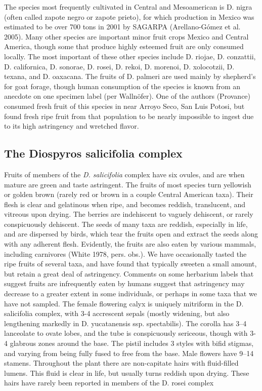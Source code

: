 \documentclass[]{article}
\begin{document}
The species most frequently cultivated in Central and Mesoamerican is D. nigra (often called zapote negro or zapote prieto), for which production in Mexico was estimated to be over 700 tons in 2001 by SAGARPA (Arellano-Gómez et al. 2005). Many other species are important minor fruit crops Mexico and Central America, though some that produce highly esteemed fruit are only consumed locally. The most important of these other species include D. riojae, D. conzattii, D. californica, D. sonorae, D. rosei, D. rekoi, D. morenoi, D. xolocotzii, D. texana, and D. oaxacana. The fruits of D. palmeri are used mainly by shepherd’s for goat forage, though human consumption of the species is known from an anecdote on one specimen label (per Wallnöfer). One of the authors (Provance) consumed fresh fruit of this species in near Arroyo Seco, San Luis Potosi, but found fresh ripe fruit from that population to be nearly impossible to ingest due to its high astringency and wretched flavor.
 
\subsection*{The Diospyros salicifolia complex}
Fruits of members of the \emph{D. salicifolia} complex have six ovules, and are when mature are green and taste astringent. The fruits of most species turn yellowish or golden brown (rarely red or brown in a couple Central American taxa). Their flesh is clear and gelatinous when ripe, and becomes reddish, translucent, and vitreous upon drying. The berries are indehiscent to vaguely dehiscent, or rarely conspicuously dehiscent. The seeds of many taxa are reddish, especially in life, and are dispersed by birds, which tear the fruits open and extract the seeds along with any adherent flesh. Evidently, the fruits are also eaten by various mammals, including carnivores (White 1978, pers. obs.). We have occasionally tasted the ripe fruits of several taxa, and have found that typically sweeten a small amount, but retain a great deal of astringency. Comments on some herbarium labels that suggest fruits are infrequently eaten by humans suggest that astringency may decrease to a greater extent in some individuals, or perhaps in some taxa that we have not sampled. The female flowering calyx is uniquely mitriform in the D. salicifolia complex, with 3-4 accrescent sepals (mostly widening, but also lengthening markedly in D. yucatanensis ssp. spectabilis). The corolla has 3–4 lanceolate to ovate lobes, and the tube is conspicuously sericeous, though with 3-4 glabrous zones around the base. The pistil includes 3 styles with bifid stigmas, and varying from being fully fused to free from the base. Male flowers have 9–14 stamens. Throughout the plant there are non-capitate hairs with fluid-filled lumens. This fluid is clear in life, but usually turns reddish upon drying. These hairs have rarely been reported in members of the D. rosei complex
 
\end{document}

